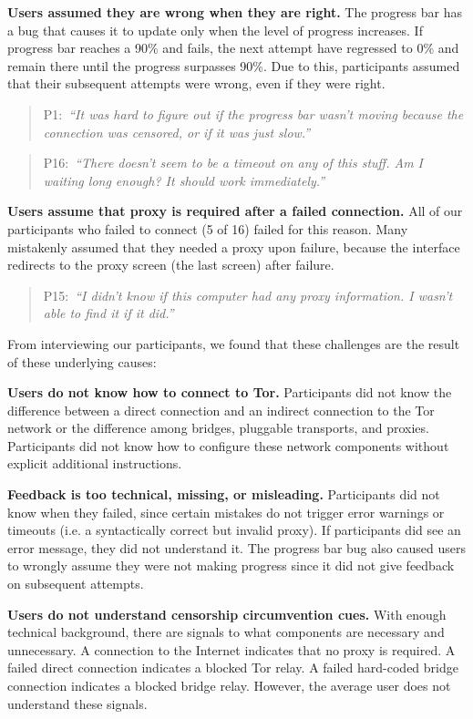 \documentclass[USenglish,oneside,twocolumn]{article}
\newcommand{\pquote}[2]{
\begin{quotation}
\noindent #1:~\textit{``#2''}
\end{quotation}
}
\begin{document}
\begin{description}
\item {\bfseries Users assumed they are wrong when they are right.}
The progress bar has a bug that causes it to update only when the level of progress increases.
If progress bar reaches a 90\% and fails, the next attempt have regressed to 0\% and remain there until the progress surpasses 90\%. Due to this, participants assumed that their subsequent attempts were wrong, even if they were right.

\smallskip
\pquote{P1}{It was hard to figure out if the progress bar wasn't moving because the connection was censored, or if it was just slow.}
\smallskip
\pquote{P16}{There doesn't seem to be a timeout on any of this stuff. Am I waiting long enough? It should work immediately.}
\smallskip

\item {\bfseries Users assume that proxy is required after a failed connection.}
All of our participants who failed to connect (5 of 16) failed for this reason. Many mistakenly assumed that they needed a proxy upon failure, because the interface redirects to the proxy screen (the last screen) after failure. 

\smallskip
\pquote{P15}{I didn't know if this computer had any proxy information. I wasn't able to find it if it did.}
\end{description}

From interviewing our participants, we found that these challenges are the result of these underlying causes: \\

\begin{description}
\item {\bfseries Users do not know how to connect to Tor.} Participants did not know the difference between a direct connection and an indirect connection to the Tor network or the difference among bridges, pluggable transports, and proxies. Participants did not know how to configure these network components without explicit additional instructions. 
\item {\bfseries Feedback is too technical, missing, or misleading.} Participants did not know when they failed, since certain mistakes do not trigger error warnings or timeouts (i.e. a syntactically correct but invalid proxy). If participants did see an error message, they did not understand it. The progress bar bug also caused users to wrongly assume they were not making progress since it did not give feedback on subsequent attempts. 
\item {\bfseries Users do not understand censorship circumvention cues.} With enough technical background, there are  signals to what components are necessary and unnecessary. A connection to the Internet indicates that no proxy is required. A failed direct connection indicates a blocked Tor relay. A failed hard-coded bridge connection indicates a blocked bridge relay. However, the average user does not understand these signals.
\end{description} 
\end{document}
